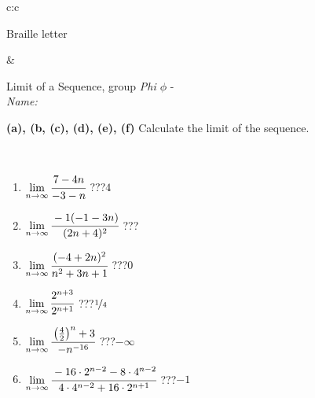 \documentclass[10pt]{report}
\begin{document}
\begin{tabular}{c:c}
\begin{minipage}[c][104.5mm][t]{0.5\linewidth}
\begin{center}
\begin{minipage}{0.20\linewidth}
\begin{center}
{\small Braille letter}
\end{center}
\end{minipage}
\end{center}
\end{minipage}
&
\begin{minipage}[c][104.5mm][t]{0.5\linewidth}
\begin{center}
\vspace{5mm}
{\huge Limit of a Sequence, group \textit{Phi $\phi$} -}\\[5mm]
\textit{Name:}\phantom{xxxxxxxxxxxxxxxxxxxxxxxxxxxxxxxxxxxxxxxxxxxxxxxxxxxxxxxxxxxxxxxxx}\\[5mm]
\begin{minipage}{0.95\linewidth}
\begin{center}
{
\textbf{(a), (b, (c), (d), (e), (f)} Calculate the limit of the sequence. \\[-1mm]
\phantom{x}
}
\end{center}
\end{minipage}
\\[1mm]
\begin{minipage}{0.79\linewidth}
\begin{center}
\begin{varwidth}{\linewidth}
\setlength{\itemsep}{0pt}
\begin{enumerate}
\normalsize
\item $\lim\limits_{n\to\infty}\cfrac{7-4n}{-3-n}$\quad \dotfill\; ???\;\dotfill \quad $4$
\item $\lim\limits_{n\to\infty}\cfrac{-1(-1-3n)}{(2n+4)^2}$\quad \dotfill\; ???\;\dotfill {}
\item $\lim\limits_{n\to\infty}\cfrac{(-4+2n)^2}{n^2+3n+1}$\quad \dotfill\; ???\;\dotfill \quad $0$
\item $\lim\limits_{n\to\infty}\cfrac{2^{n+3}}{2^{n+1}}$\quad \dotfill\; ???\;\dotfill \quad $\nicefrac{1}{4}$
\item $\lim\limits_{n\to\infty}\cfrac{\left(\frac{4}{2}\right)^n +3}{-n^{-16}}$\quad \dotfill\; ???\;\dotfill \quad $-\infty$
\item $\lim\limits_{n\to\infty}\cfrac{-16\cdot 2^{n-2}-8\cdot 4^{n-2}}{4\cdot 4^{n-2}+16\cdot 2^{n+1}}$\quad \dotfill\; ???\;\dotfill \quad $-1$
\end{enumerate}
\end{varwidth}
\end{center}
\end{minipage}
\begin{minipage}{0.20\linewidth}

\end{minipage}
\end{center}
\end{minipage}
\end{tabular}
\end{document}
